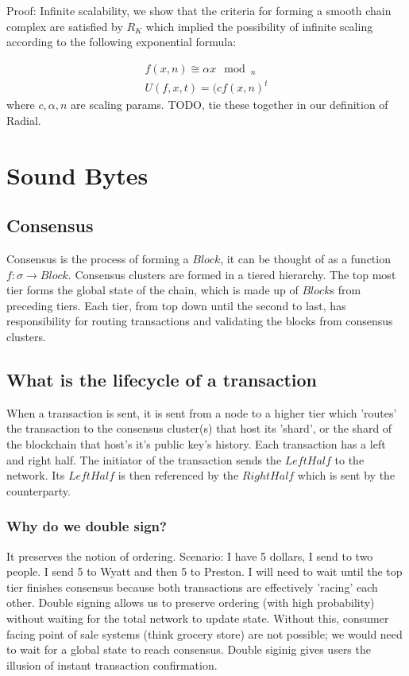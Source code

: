 \documentclass{article}
\begin{document}
\begin{center} 
Proof: Infinite scalability, we show that the criteria for forming a smooth chain complex are satisfied by $R_K$ which implied the possibility of infinite scaling according to the following exponential formula:
\begin{center} 

\begin{equation} \label{eq1}
\begin{split}
f(x, n) \cong \alpha x \mod_n \\
U(f, x, t) = (c f(x, n)^t
\end{split}
\end{equation}
where $c, \alpha, n$ are scaling params. TODO, tie these together in our definition of Radial.

\section{Sound Bytes}
\subsection{Consensus}
Consensus is the process of forming a $Block$, it can be thought of as a function $f: \sigma \rightarrow Block$. Consensus clusters are formed in a tiered hierarchy. The top most tier forms the global state of the chain, which is made up of $Block$s from preceding tiers. Each tier, from top down until the second to last, has responsibility for routing transactions and validating the blocks from consensus clusters. 

\subsection{What is the lifecycle of a transaction}
When a transaction is sent, it is sent from a node to a higher tier which 'routes' the transaction to the consensus cluster(s) that host its 'shard', or the shard of the blockchain that host's it's public key's history. Each transaction has a left and right half. The initiator of the transaction sends the $LeftHalf$ to the network. Its $LeftHalf$ is then referenced by the $RightHalf$ which is sent by the counterparty.

\subsubsection{Why do we double sign?}
It preserves the notion of ordering. Scenario: I have 5 dollars, I send to two people. I send 5 to Wyatt and then 5 to Preston. I will need to wait until the top tier finishes consensus because both transactions are effectively 'racing' each other. Double signing allows us to preserve ordering (with high probability) without waiting for the total network to update state. Without this, consumer facing point of sale systems (think grocery store) are not possible; we would need to wait for a global state to reach consensus. Double siginig gives users the illusion of instant transaction confirmation.


\end{center}
\end{center}
\end{document}
